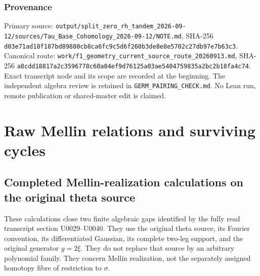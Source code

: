 \documentclass[10pt,a4paper,oneside]{report}
\begin{document}
\subsection{Provenance}\label{proof05:provenance}

Primary source:
\texttt{output/\allowbreak{}split\_\allowbreak{}zero\_\allowbreak{}rh\_\allowbreak{}tandem\_\allowbreak{}2026-\allowbreak{}09-\allowbreak{}12/\allowbreak{}sources/\allowbreak{}Tau\_\allowbreak{}Base\_\allowbreak{}Cohomology\_\allowbreak{}2026-\allowbreak{}09-\allowbreak{}12/\allowbreak{}NOTE.md},
SHA-256
\texttt{d03e71ad\allowbreak{}18f187bd\allowbreak{}89880cb8\allowbreak{}ca6fc9c5\allowbreak{}d6f260b3\allowbreak{}de8e8e57\allowbreak{}02c27db9\allowbreak{}7e7b63c3}.
Canonical route:
\texttt{work/\allowbreak{}f1\_\allowbreak{}geometry\_\allowbreak{}current\_\allowbreak{}source\_\allowbreak{}route\_\allowbreak{}20260913.md}, SHA-256
\texttt{a8cdd188\allowbreak{}17a2c359\allowbreak{}6778c60a\allowbreak{}04ef9d76\allowbreak{}125a03ae\allowbreak{}54047598\allowbreak{}35a2bc2b\allowbreak{}18fa4c74}.
Exact transcript node and its scope are recorded at the beginning. The
independent algebra review is retained in
\texttt{GERM\_\allowbreak{}PAIRING\_\allowbreak{}CHECK.md}. No Lean run, remote publication or
shared-master edit is claimed.


\endgroup
\clearpage
\chapter{Raw Mellin relations and surviving cycles}
\begingroup
\section{Completed Mellin-realization calculations on the original theta source}\label{proof06:typed-mellin:completed-mellin-realization-calculations-on-the-original-theta-source}

These calculations close two finite algebraic gaps identified by the fully read transcript section U0029--U0040. They use the original theta source, its Fourier convention, its differentiated Gaussian, its complete two-leg support, and the original generator \(g=2\xi\). They do not replace that source by an arbitrary polynomial family. They concern Mellin realization, not the separately assigned homotopy fibre of restriction to \(\sigma\).
\end{document}
